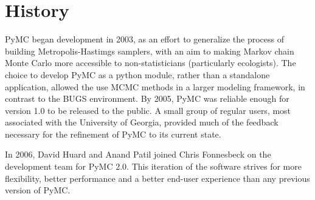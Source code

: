 
\hypertarget{history}{}
\section*{History}
\label{history}

PyMC began development in 2003, as an effort to generalize the process of building Metropolis-Hastimgs samplers, with an aim to making Markov chain Monte Carlo more accessible to non-statisticians (particularly ecologists). The choice to develop PyMC as a python module, rather than a standalone application, allowed the use MCMC methods in a larger modeling framework, in contrast to the BUGS environment. By 2005, PyMC was reliable enough for version 1.0 to be released to the public. A small group of regular users, most associated with the University of Georgia, provided much of the feedback necessary for the refinement of PyMC to its current state.

In 2006, David Huard and Anand Patil joined Chris Fonnesbeck on the development team for PyMC 2.0. This iteration of the software strives for more flexibility, better performance and a better end-user experience than any previous version of PyMC.



\